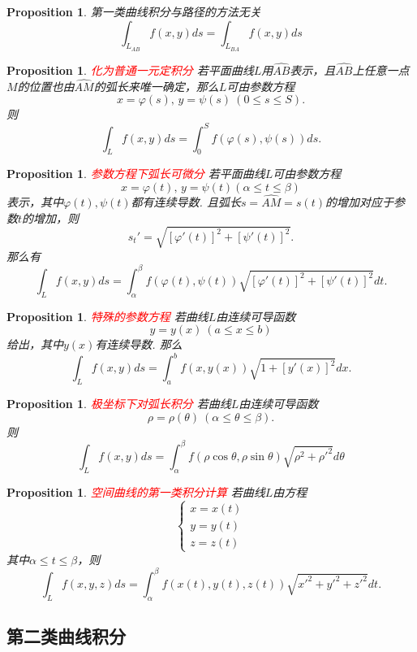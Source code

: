 \documentclass{article}
\newtheorem{proposition}[theorem]{Proposition}
\newcommand{\redt}[1]{\textcolor{red}{#1}}
\begin{document}
\begin{proposition}
\rm 第一类曲线积分与路径的方法无关
$$
\int_{L_{AB}} f(x,y)ds = \int_{L_{BA}} f(x,y)ds
$$
\end{proposition}


\begin{proposition}
\rm \redt{化为普通一元定积分} 若平面曲线$L$用$\widehat{AB}$表示，且$\widehat{AB}$上任意一点$M$的位置也由$\widehat{AM}$的弧长来唯一确定，那么$L$可由参数方程
$$
x = \varphi(s), \, y = \psi(s) ~ (0 \leq s \leq S).
$$
则
$$
\int_L f(x,y)ds = \int_{0}^S f(\varphi(s),\psi(s))ds.
$$
\end{proposition}

\begin{proposition}
\rm \redt{参数方程下弧长可微分} 若平面曲线$L$可由参数方程
$$
x = \varphi(t), \, y = \psi(t) (\alpha \leq t \leq \beta)
$$
表示，其中$\varphi(t),\psi(t)$都有连续导数. 且弧长$s = \widehat{AM} = s(t)$的增加对应于参数$t$的增加，则
$$
s_t' = \sqrt{[\varphi'(t)]^2+[\psi'(t)]^2}.
$$
那么有
$$
\int_L f(x,y)ds = \int_\alpha^\beta f(\varphi(t),\psi(t))\sqrt{[\varphi'(t)]^2+[\psi'(t)]^2}dt. 
$$
\end{proposition}

\begin{proposition}
\rm \redt{特殊的参数方程} 若曲线$L$由连续可导函数
$$
y=y(x) ~ (a \leq x \leq b)
$$
给出，其中$y(x)$有连续导数. 那么
$$
\int_L f(x,y)ds = \int_a^b f(x,y(x))\sqrt{1+ [y'(x)]^2}dx. 
$$
\end{proposition}

\begin{proposition}
\rm \redt{极坐标下对弧长积分} 若曲线$L$由连续可导函数
$$
\rho = \rho(\theta) ~ (\alpha \leq \theta \leq \beta).
$$
则
$$
\int_L f(x,y)ds = \int_\alpha^\beta f(\rho\cos\theta,\rho\sin\theta)\sqrt{\rho^2+\rho'^2}d\theta
$$
\end{proposition}

\begin{proposition}
\rm \redt{空间曲线的第一类积分计算} 若曲线$L$由方程
$$
\left\{
\begin{array}{ll}
x = x(t)\\
y = y(t)\\
z = z(t) 
\end{array} \right.
$$
其中$\alpha \leq t \leq \beta$，则
$$
\int_L f(x,y,z)ds = \int_\alpha^{\beta} f(x(t),y(t),z(t))\sqrt{x'^2 + y'^2 + z'^2}dt.
$$
\end{proposition}

\subsection{第二类曲线积分}
\end{document}
